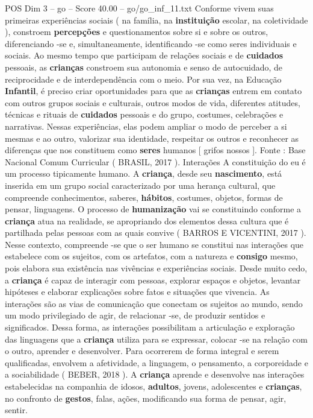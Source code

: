 \begin{textsample}{POS Dim 3 – go – Score 40.00 – go/go\_inf\_11.txt}
Conforme vivem suas primeiras experiências sociais ( na família, na \textbf{instituição} escolar, na coletividade ), constroem \textbf{percepções} e questionamentos sobre si e sobre os outros, diferenciando -se e, simultaneamente, identificando -se como seres individuais e sociais.
Ao mesmo tempo que participam de relações sociais e de \textbf{cuidados} pessoais, as \textbf{crianças} constroem sua autonomia e senso de autocuidado, de reciprocidade e de interdependência com o meio.
Por sua vez, na Educação \textbf{Infantil}, é preciso criar oportunidades para que as \textbf{crianças} entrem em contato com outros grupos sociais e culturais, outros modos de vida, diferentes atitudes, técnicas e rituais de \textbf{cuidados} pessoais e do grupo, costumes, celebrações e narrativas.
Nessas experiências, elas podem ampliar o modo de perceber a si mesmas e ao outro, valorizar sua identidade, respeitar os outros e reconhecer as diferenças que nos constituem como \textbf{seres} humanos [ grifos nossos ].
Fonte : Base Nacional Comum Curricular ( BRASIL, 2017 ).
Interações A constituição do eu é um processo tipicamente humano.
A \textbf{criança}, desde seu \textbf{nascimento}, está inserida em um grupo social caracterizado por uma herança cultural, que compreende conhecimentos, saberes, \textbf{hábitos}, costumes, objetos, formas de pensar, linguagens.
O processo de \textbf{humanização} vai se constituindo conforme a \textbf{criança} atua na realidade, se apropriando dos elementos dessa cultura que é partilhada pelas pessoas com as quais convive ( BARROS E VICENTINI, 2017 ).
Nesse contexto, compreende -se que o ser humano se constitui nas interações que estabelece com os sujeitos, com os artefatos, com a natureza e \textbf{consigo} mesmo, pois elabora sua existência nas vivências e experiências sociais.
Desde muito cedo, a \textbf{criança} é capaz de interagir com pessoas, explorar espaços e objetos, levantar hipóteses e elaborar explicações sobre fatos e situações que vivencia.
As interações são as vias de comunicação que conectam os sujeitos ao mundo, sendo um modo privilegiado de agir, de relacionar -se, de produzir sentidos e significados.
Dessa forma, as interações possibilitam a articulação e exploração das linguagens que a \textbf{criança} utiliza para se expressar, colocar -se na relação com o outro, aprender e desenvolver.
Para ocorrerem de forma integral e serem qualificadas, envolvem a afetividade, a linguagem, o pensamento, a corporeidade e a sociabilidade ( BEBER, 2018 ).
A \textbf{criança} aprende e desenvolve nas interações estabelecidas na companhia de idosos, \textbf{adultos}, jovens, adolescentes e \textbf{crianças}, no confronto de \textbf{gestos}, falas, ações, modificando sua forma de pensar, agir, sentir.

\end{textsample}
